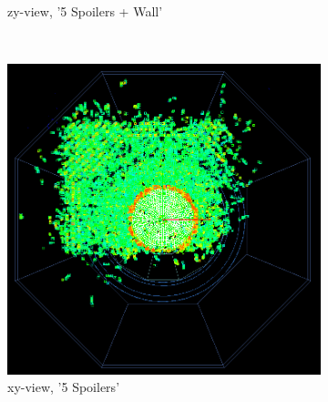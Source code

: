 \begin{figure}
\begin{subfigure}[b]{0.49\textwidth}
\begin{center}
        \caption{zy-view, '5 Spoilers + Wall'}
        \label{fig:zy_5SpoilersWall}
    \end{center}
    \end{subfigure}\\
    \begin{subfigure}[b]{0.49\textwidth}
    \begin{center}
        \includegraphics[height=0.3\textheight]{figures/muons_positron_5spoilers_2961_xyview_croped.png}
        \caption{xy-view, '5 Spoilers'}
	\label{fig:xy_5Spoilers}
    \end{center}
    \end{subfigure}
    \begin{subfigure}[b]{0.49\textwidth}
    \begin{center}

\end{center}
\end{subfigure}
\end{figure}
